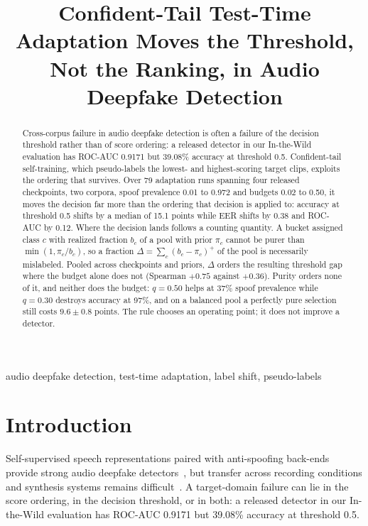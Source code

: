 \documentclass[10pt,letterpaper]{article}
\title{Confident-Tail Test-Time Adaptation Moves the Threshold,\\
Not the Ranking, in Audio Deepfake Detection}
\begin{document}
\maketitle

\begin{abstract}
Cross-corpus failure in audio deepfake detection is often a failure of the
decision threshold rather than of score ordering: a released detector in our
In-the-Wild evaluation has ROC-AUC 0.9171 but 39.08\% accuracy at threshold
0.5. Confident-tail self-training, which pseudo-labels the lowest- and
highest-scoring target clips, exploits the ordering that survives. Over 79
adaptation runs spanning four released checkpoints, two corpora, spoof
prevalence 0.01 to 0.972 and budgets 0.02 to 0.50, it moves the decision far
more than the ordering that decision is applied to: accuracy at threshold 0.5
shifts by a median of 15.1 points while EER shifts by 0.38 and ROC-AUC by 0.12.
Where the decision lands follows a counting quantity. A bucket assigned class
$c$ with realized fraction $b_c$ of a pool with prior $\pi_c$ cannot be purer
than $\min(1,\pi_c/b_c)$, so a fraction $\Delta=\sum_c(b_c-\pi_c)^{+}$ of the
pool is necessarily mislabeled. Pooled across checkpoints and priors, $\Delta$
orders the resulting threshold gap where the budget alone does not (Spearman
$+0.75$ against $+0.36$). Purity orders none of it, and neither does the
budget: $q=0.50$ helps at 37\% spoof prevalence while $q=0.30$ destroys
accuracy at 97\%, and on a balanced pool a perfectly pure selection still costs
$9.6\pm0.8$ points. The rule chooses an operating point; it does not improve a
detector.
\end{abstract}
\begin{keywords}
audio deepfake detection, test-time adaptation, label shift, pseudo-labels
\end{keywords}

\section{Introduction}
\label{sec:intro}
Self-supervised speech representations paired with anti-spoofing back-ends
provide strong audio deepfake detectors~\cite{wav2vec2aug,aasist}, but transfer
across recording conditions and synthesis systems remains difficult~\cite{itw}.
A target-domain failure can lie in the score ordering, in the decision
threshold, or in both: a released detector in our In-the-Wild evaluation has
ROC-AUC 0.9171 but 39.08\% accuracy at threshold 0.5.
\end{document}

